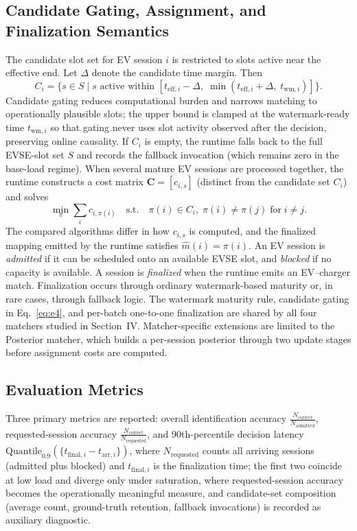 \documentclass{ieeeaccess}
\begin{document}
    \subsection{Candidate Gating, Assignment, and Finalization Semantics}
    The candidate slot set for EV session $i$ is restricted to slots active near the effective end.
    Let $\Delta$ denote the candidate time margin.
    Then
    \begin{equation}\label{eq:e4}
        C_i = \{ s \in S \mid s \text{ active within } [t_{\text{eff},i} - \Delta, \; \min(t_{\text{eff},i} + \Delta,\; t_{\text{wm},i})] \}.
    \end{equation}
    Candidate gating reduces computational burden and narrows matching to operationally plausible slots; the upper bound is clamped at the watermark-ready time $t_{\text{wm},i}$ so that gating never uses slot activity observed after the decision, preserving online causality.
    If $C_i$ is empty, the runtime falls back to the full EVSE-slot set $S$ and records the fallback invocation (which remains zero in the base-load regime).
    When several mature EV sessions are processed together, the runtime constructs a cost matrix $\mathbf{C} = [c_{i,s}]$ (distinct from the candidate set $C_i$) and solves
    \begin{equation}\label{eq:e5}
        \min_\pi \sum_i c_{i,\pi(i)} \quad \text{s.t.} \quad \pi(i) \in C_i,\; \pi(i) \neq \pi(j)\;\text{for}\;i \neq j.
    \end{equation}
    The compared algorithms differ in how $c_{i,s}$ is computed, and the finalized mapping emitted by the runtime satisfies $\hat{m}(i) = \pi(i)$.
    An EV session is \textit{admitted} if it can be scheduled onto an available EVSE slot, and \textit{blocked} if no capacity is available.
    A session is \textit{finalized} when the runtime emits an EV--charger match.
    Finalization occurs through ordinary watermark-based maturity or, in rare cases, through fallback logic.
    The watermark maturity rule, candidate gating in Eq.~\eqref{eq:e4}, and per-batch one-to-one finalization are shared by all four matchers studied in Section~IV.
    Matcher-specific extensions are limited to the Posterior matcher, which builds a per-session posterior through two update stages before assignment costs are computed.

    \subsection{Evaluation Metrics}
    Three primary metrics are reported: overall identification accuracy $\tfrac{N_{\text{correct}}}{N_{\text{admitted}}}$, requested-session accuracy $\tfrac{N_{\text{correct}}}{N_{\text{requested}}}$, and 90th-percentile decision latency $\text{Quantile}_{0.9}(\{t_{\text{final},i} - t_{\text{arr},i}\})$, where $N_{\text{requested}}$ counts all arriving sessions (admitted plus blocked) and $t_{\text{final},i}$ is the finalization time; the first two coincide at low load and diverge only under saturation, where requested-session accuracy becomes the operationally meaningful measure, and candidate-set composition (average count, ground-truth retention, fallback invocations) is recorded as auxiliary diagnostic.
\end{document}
